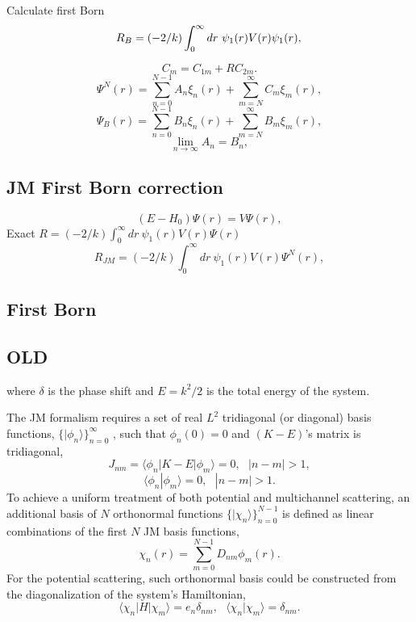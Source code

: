 \documentclass[aip,pra,showpacs,aps,twocolumn,groupedaddress,floatfix]{revtex4}
\newcommand{\beq}{\begin{equation}}
\newcommand{\eeq}{\end{equation}}
\begin{document}
Calculate first Born
\beq
R_{B} = (-2/k) \int_0^\infty dr\ \psi_1(r) V(r) \psi_1(r), \\
\eeq

\beq
C_m = C_{1m} + R C_{2m}.
\eeq
\beq
\Psi^N(r) = \sum_{n=0}^{N-1} A_n \xi_n(r) + \sum_{m=N}^{\infty} C_m \xi_m(r),
\eeq
\beq
\Psi_B(r) = \sum_{n=0}^{N-1} B_n \xi_n(r) + \sum_{m=N}^{\infty} B_m \xi_m(r),
\eeq
\beq
\lim_{n \rightarrow \infty} A_n = B_n,
\eeq


\subsection{JM First Born correction}
\beq
(E-H_0) \Psi (r) = V \Psi(r),
\eeq
Exact $R = (-2/k) \int_0^\infty dr\ \psi_1(r) V(r) \Psi(r)$
\beq
R_{JM} = (-2/k) \int_0^\infty dr\ \psi_1(r) V(r) \Psi^N(r),
\eeq

\subsection{First Born}


\subsection{OLD}
where $\delta$ is the phase shift and $E=k^2/2$ is the total energy of the system.

The JM formalism   \cite{HY74p1201, YF75} requires a set of real $L^2$  tridiagonal (or diagonal) basis functions, $\{|\phi_n\rangle\}_{n=0}^\infty$ , such that   $\phi_n(0)=0$ and $(K-E)$'s matrix is tridiagonal,
\beq
J_{nm}=\langle\phi_n|K-E|\phi_m\rangle=0 , \ \ \  |n-m|>1, \label{Jnm}
\eeq
\beq
\langle\phi_n|\phi_m\rangle=0 , \ \ \  |n-m|>1.
\eeq
To achieve a uniform treatment of both potential and multichannel scattering, an additional basis of $N$ orthonormal functions $\{|\chi_n\rangle\}_{n=0}^{N-1}$  is defined as linear combinations of the first $N$  JM basis functions,
\beq
\chi_n(r)=\sum_{m=0}^{N-1} D_{nm} \phi_m(r). \label{chi_n}
\eeq
For the potential scattering, such orthonormal basis could be constructed from the diagonalization of the system's Hamiltonian,
\beq
\langle\chi_n|H|\chi_m\rangle=e_n\delta_{nm} , \ \ \ \langle\chi_n|\chi_m\rangle=\delta_{nm}. \label{chi_H}
\eeq
\end{document}
